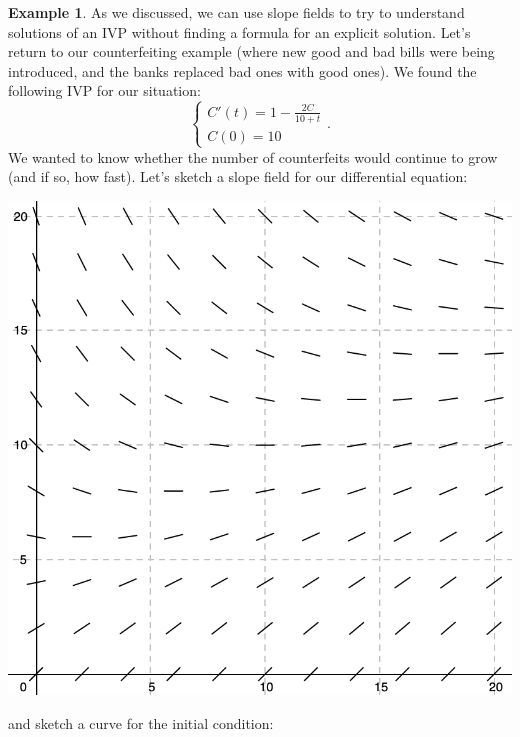 \documentclass[12pt]{amsart}
\numberwithin{equation}{section}
\theoremstyle{plain} %
\theoremstyle{definition}
\newtheorem{ex}[equation]{Example}
\theoremstyle{remark}
\begin{document}
\begin{ex} As we discussed, we can use slope fields to try to understand solutions of an IVP without finding a formula for an explicit solution. Let's return to our counterfeiting example (where new good and bad bills were being introduced, and the banks replaced bad ones with good ones). We found the following IVP for our situation:
\[ \begin{cases} C'(t) = 1-\frac{2C}{10+t} \\
C(0)=10\end{cases}.\]
We wanted to know whether the number of counterfeits would continue to grow (and if so, how fast).
Let's sketch a slope field for our differential equation:
\begin{center}\includegraphics[scale=.5]{sf7}\end{center}
and sketch a curve for the initial condition:

\end{ex}
\end{document}

